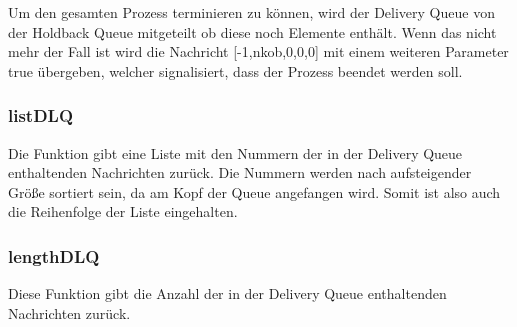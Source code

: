 Um den gesamten Prozess terminieren zu können, wird der Delivery Queue von der Holdback Queue mitgeteilt ob diese noch Elemente enthält. Wenn das nicht mehr der Fall ist wird die Nachricht [-1,nkob,0,0,0] mit einem weiteren Parameter true übergeben, welcher signalisiert, dass der Prozess beendet werden soll. 

\subsubsection{listDLQ}

Die Funktion gibt eine Liste mit den Nummern der in der Delivery Queue enthaltenden Nachrichten zurück. Die Nummern werden nach aufsteigender Größe sortiert sein, da am Kopf der Queue angefangen wird. Somit ist also auch die Reihenfolge der Liste eingehalten. 

\subsubsection{lengthDLQ}

Diese Funktion gibt die Anzahl der in der Delivery Queue enthaltenden Nachrichten zurück. 